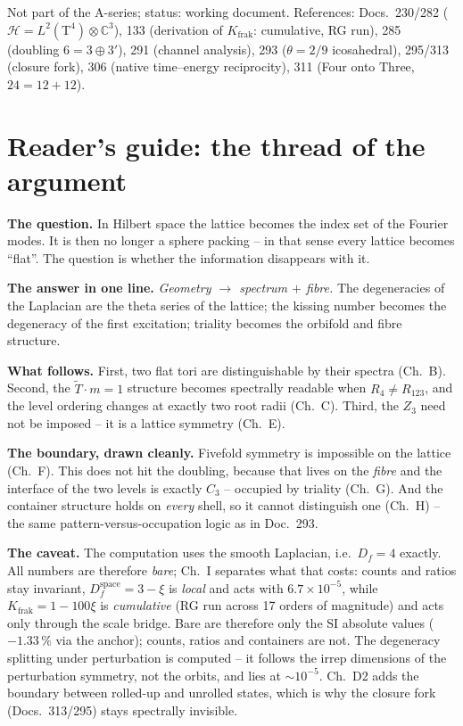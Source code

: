 Not part of the A-series; status: working document. References:
Docs.~230/282 ($\mathcal{H} = L^2(\text{T}^4)\otimes\mathbb{C}^3$),
133 (derivation of $K_\text{frak}$: cumulative, RG run), 285
(doubling $6 = 3\oplus3'$), 291 (channel analysis), 293
($\theta = 2/9$ icosahedral), 295/313 (closure fork), 306 (native time--energy
reciprocity), 311 (Four onto Three, $24 = 12+12$).

\section*{Reader's guide: the thread of the argument}

\textbf{The question.} In Hilbert space the lattice becomes the
index set of the Fourier modes. It is then no longer a sphere
packing -- in that sense every lattice becomes \enquote{flat}. The
question is whether the information disappears with it.

\textbf{The answer in one line.} \emph{Geometry $\to$ spectrum $+$
fibre.} The degeneracies of the Laplacian are the theta series of
the lattice; the kissing number becomes the degeneracy of the first
excitation; triality becomes the orbifold and fibre structure.

\textbf{What follows.} First, two flat tori are distinguishable by
their spectra (Ch.~B). Second, the $\tilde T\cdot m = 1$ structure
becomes spectrally readable when $R_4 \ne R_{123}$, and the level
ordering changes at exactly two root radii (Ch.~C). Third, the
$Z_3$ need not be imposed -- it is a lattice symmetry (Ch.~E).

\textbf{The boundary, drawn cleanly.} Fivefold symmetry is
impossible on the lattice (Ch.~F). This does not hit the doubling,
because that lives on the \emph{fibre} and the interface of the two
levels is exactly $C_3$ -- occupied by triality (Ch.~G). And the
container structure holds on \emph{every} shell, so it cannot
distinguish one (Ch.~H) -- the same pattern-versus-occupation logic
as in Doc.~293.

\textbf{The caveat.} The computation uses the smooth Laplacian,
i.e.\ $D_f = 4$ exactly. All numbers are therefore \emph{bare};
Ch.~I separates what that costs: counts and ratios stay invariant,
$D_f^\text{space} = 3-\xi$ is \emph{local} and acts with
$6.7\times10^{-5}$, while $K_\text{frak} = 1-100\xi$ is
\emph{cumulative} (RG run across 17 orders of magnitude) and acts
only through the scale bridge. Bare are therefore only the SI
absolute values ($-1.33\,\%$ via the anchor); counts, ratios and
containers are not. The degeneracy splitting under perturbation is
computed -- it follows the irrep dimensions of the perturbation
symmetry, not the orbits, and lies at $\sim10^{-5}$. Ch.~D2 adds
the boundary between rolled-up and unrolled states, which is why
the closure fork (Docs.~313/295) stays spectrally invisible.

